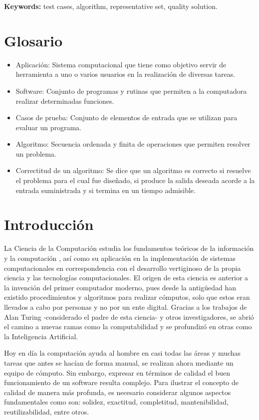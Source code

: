 \documentclass[a4paper,openright,11pt,oneside]{book}
\begin{document}
	\textbf{Keywords:} test cases, algorithm, representative set, quality solution.

\chapter*{Glosario}
	\begin{itemize}
		\item Aplicación: Sistema computacional que tiene como objetivo servir de herramienta a uno o varios usuarios en la realización de diversas tareas.
		\item Software: Conjunto de programas y rutinas que permiten a la computadora realizar determinadas funciones.
		\item Casos de prueba: Conjunto de elementos de entrada que se utilizan para evaluar un programa.
		\item Algoritmo: Secuencia ordenada y finita de operaciones que permiten resolver un problema.
		\item Correctitud de un algoritmo: Se dice que un algoritmo es correcto si resuelve el problema para el cual fue diseñado, si produce la salida deseada acorde a la entrada suministrada y si termina en un tiempo admisible.
	\end{itemize}
	
\chapter{Introducción}

	La Ciencia de la Computación estudia los fundamentos teóricos de la información y la computación \cite{montero2017computacion}, así como su aplicación en la implementación de sistemas computacionales en correspondencia con el desarrollo vertiginoso de la propia ciencia y las tecnologías computacionales. El origen de esta ciencia es anterior a la invención del primer computador moderno, pues desde la antigüedad han existido procedimientos y algoritmos para realizar cómputos, solo que estos eran llevados a cabo por personas y no por un ente digital. Gracias a los trabajos de Alan Turing \cite{Turing} -considerado el padre de esta ciencia- y otros investigadores, se abrió el camino a nuevas ramas como la computabilidad y se profundizó en otras como la Inteligencia Artificial.
	
	Hoy en día la computación ayuda al hombre en casi todas las áreas y muchas tareas que antes se hacían de forma manual, se realizan ahora mediante un equipo de cómputo. Sin embargo, expresar en términos de calidad el buen funcionamiento de un software \cite{lopez2016definicion} resulta complejo. Para ilustrar el concepto de calidad de manera más profunda, es necesario considerar algunos aspectos fundamentales como son: solidez, exactitud, completitud, mantenibilidad, reutilizabilidad, entre otros.
	
\end{document}
